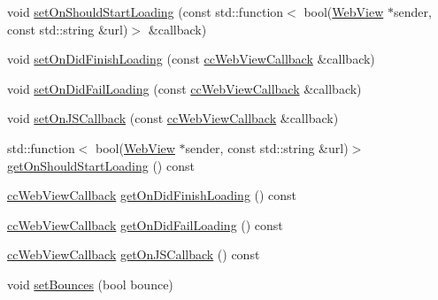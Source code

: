 \begin{DoxyCompactItemize}
\item 
void \hyperlink{classexperimental_1_1ui_1_1WebView_a212732b5b2ec9bd73084c57a140b5dd8}{set\+On\+Should\+Start\+Loading} (const std\+::function$<$ bool(\hyperlink{classexperimental_1_1ui_1_1WebView}{Web\+View} $\ast$sender, const std\+::string \&url)$>$ \&callback)
\item 
void \hyperlink{classexperimental_1_1ui_1_1WebView_a6fb8d736506be3151a8a5e3f08d6b7ea}{set\+On\+Did\+Finish\+Loading} (const \hyperlink{classexperimental_1_1ui_1_1WebView_a11ddd376a5996eff614857f236b2b69d}{cc\+Web\+View\+Callback} \&callback)
\item 
void \hyperlink{classexperimental_1_1ui_1_1WebView_aae599457e3ff606b3b3751bcebe1df29}{set\+On\+Did\+Fail\+Loading} (const \hyperlink{classexperimental_1_1ui_1_1WebView_a11ddd376a5996eff614857f236b2b69d}{cc\+Web\+View\+Callback} \&callback)
\item 
void \hyperlink{classexperimental_1_1ui_1_1WebView_a434bac1a0a15294300ada912b85c35f4}{set\+On\+J\+S\+Callback} (const \hyperlink{classexperimental_1_1ui_1_1WebView_a11ddd376a5996eff614857f236b2b69d}{cc\+Web\+View\+Callback} \&callback)
\item 
std\+::function$<$ bool(\hyperlink{classexperimental_1_1ui_1_1WebView}{Web\+View} $\ast$sender, const std\+::string \&url)$>$ \hyperlink{classexperimental_1_1ui_1_1WebView_ad8bf0cc832c0d88fcb1317563c14242f}{get\+On\+Should\+Start\+Loading} () const
\item 
\hyperlink{classexperimental_1_1ui_1_1WebView_a11ddd376a5996eff614857f236b2b69d}{cc\+Web\+View\+Callback} \hyperlink{classexperimental_1_1ui_1_1WebView_a2bebc9f5a5744de9e6e9a80d57bc6fde}{get\+On\+Did\+Finish\+Loading} () const
\item 
\hyperlink{classexperimental_1_1ui_1_1WebView_a11ddd376a5996eff614857f236b2b69d}{cc\+Web\+View\+Callback} \hyperlink{classexperimental_1_1ui_1_1WebView_a43b0257e48e199521030bb6a35578549}{get\+On\+Did\+Fail\+Loading} () const
\item 
\hyperlink{classexperimental_1_1ui_1_1WebView_a11ddd376a5996eff614857f236b2b69d}{cc\+Web\+View\+Callback} \hyperlink{classexperimental_1_1ui_1_1WebView_a33c0a59576feca0f08efcdfa88243147}{get\+On\+J\+S\+Callback} () const
\item 
void \hyperlink{classexperimental_1_1ui_1_1WebView_a0663d633aad187ab648d46521841979d}{set\+Bounces} (bool bounce)
\item 
\mbox{\label{classexperimental_1_1ui_1_1WebView_a60687b67b465a78655fde86fb7923905}} 

\end{DoxyCompactItemize}
